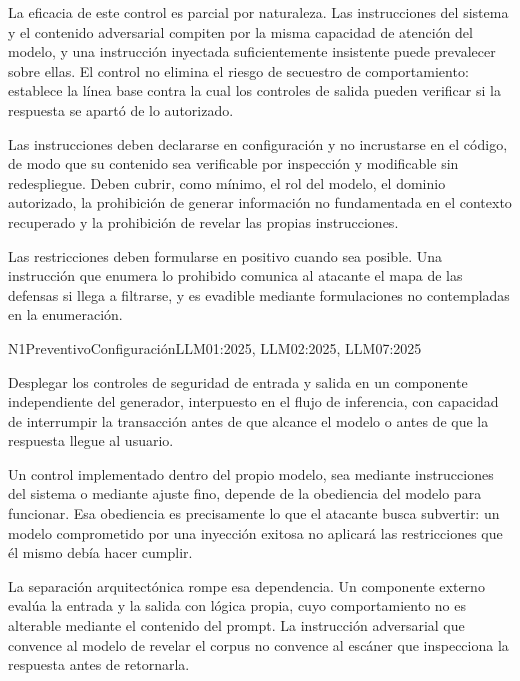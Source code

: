 La eficacia de este control es parcial por naturaleza. Las instrucciones del sistema y el contenido adversarial compiten por la misma capacidad de atención del modelo, y una instrucción inyectada suficientemente insistente puede prevalecer sobre ellas. El control no elimina el riesgo de secuestro de comportamiento: establece la línea base contra la cual los controles de salida pueden verificar si la respuesta se apartó de lo autorizado.

Las instrucciones deben declararse en configuración y no incrustarse en el código, de modo que su contenido sea verificable por inspección y modificable sin redespliegue. Deben cubrir, como mínimo, el rol del modelo, el dominio autorizado, la prohibición de generar información no fundamentada en el contexto recuperado y la prohibición de revelar las propias instrucciones.

Las restricciones deben formularse en positivo cuando sea posible. Una instrucción que enumera lo prohibido comunica al atacante el mapa de las defensas si llega a filtrarse, y es evadible mediante formulaciones no contempladas en la enumeración.


  {N1}{Preventivo}{Configuración}{LLM01:2025, LLM02:2025, LLM07:2025}

Desplegar los controles de seguridad de entrada y salida en un componente independiente del generador, interpuesto en el flujo de inferencia, con capacidad de interrumpir la transacción antes de que alcance el modelo o antes de que la respuesta llegue al usuario.

Un control implementado dentro del propio modelo, sea mediante instrucciones del sistema o mediante ajuste fino, depende de la obediencia del modelo para funcionar. Esa obediencia es precisamente lo que el atacante busca subvertir: un modelo comprometido por una inyección exitosa no aplicará las restricciones que él mismo debía hacer cumplir.

La separación arquitectónica rompe esa dependencia. Un componente externo evalúa la entrada y la salida con lógica propia, cuyo comportamiento no es alterable mediante el contenido del prompt. La instrucción adversarial que convence al modelo de revelar el corpus no convence al escáner que inspecciona la respuesta antes de retornarla.


